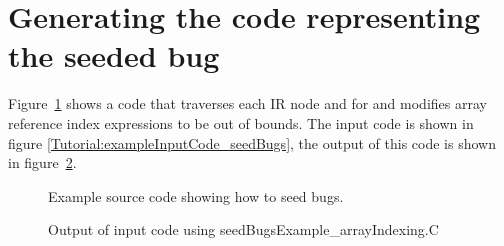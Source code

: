 \section{Generating the code representing the seeded bug}

    Figure~\ref{Tutorial:example_seedBugs}
shows a code that traverses each IR node and for and
modifies array reference index expressions to be out of bounds.
The input code is shown in figure \ref{Tutorial:exampleInputCode_seedBugs},
the output of this code is shown in 
figure~\ref{Tutorial:exampleOutput_seedBugs}.


\begin{figure}[!h]
{\indent
{
\mySmallestFontSize

\begin{latexonly}
   
\end{latexonly}

\begin{htmlonly}
   
\end{htmlonly}

}
}
\caption{Example source code showing how to seed bugs. }
\label{Tutorial:example_seedBugs}
\end{figure}


\begin{figure}[!h]
{\indent
{\mySmallFontSize

\begin{latexonly}
   
\end{latexonly}

\begin{htmlonly}
   
\end{htmlonly}

}
}
\caption{Output of input code using seedBugsExample\_arrayIndexing.C}
\label{Tutorial:exampleOutput_seedBugs}
\end{figure}

